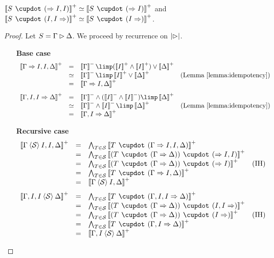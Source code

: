 \begin{lemma}
  $\psint{S \mix (\seq I, I)} \semequiv \psint{S \mix (\seq I)}$ and
  $\psint{S \mix (I, I \seq)} \semequiv \psint{S \mix (I \seq)}$.
\end{lemma}
\begin{proof}
  Let $S = \Gamma \mathbin{\rhd} \Delta$. We proceed by recurrence on $\left|\mathbin{\rhd}\right|$.
  \begin{itemize}
    \item[\textbf{Base case}]
    $$
    \begin{array}{rcll}
      \psint{\Gamma \seq I, I, \Delta}
      &=& \nsint{\Gamma} \limp (\psint{I} \land \psint{I}) \vee \psint{\Delta} & \\
      &\semequiv& \nsint{\Gamma} \limp \psint{I} \vee \psint{\Delta} &\text{(\reflemma{idempotency})} \\
      &=& \psint{\Gamma \seq I, \Delta} & \\
    \end{array}
    $$
    $$
    \begin{array}{rcll}
      \psint{\Gamma, I, I \seq \Delta}
      &=& \nsint{\Gamma} \land (\nsint{I} \land \nsint{I}) \limp \psint{\Delta} & \\
      &\semequiv& \nsint{\Gamma} \land \nsint{I} \limp \psint{\Delta} &\text{(\reflemma{idempotency})} \\
      &=& \psint{\Gamma, I \seq \Delta} & \\
    \end{array}
    $$
    \item[\textbf{Recursive case}]
    $$
    \begin{array}{rcll}
      \psint{\Gamma \piq{\cS} I, I, \Delta}
      &=& \bigwedge_{T \in \cS}{\psint{T \mix (\Gamma \seq I, I, \Delta)}} & \\
      &=& \bigwedge_{T \in \cS}{\psint{(T \mix (\Gamma \seq \Delta)) \mix (\seq I, I)}} & \\
      &=& \bigwedge_{T \in \cS}{\psint{(T \mix (\Gamma \seq \Delta)) \mix (\seq I)}} &\text{(IH)} \\
      &=& \bigwedge_{T \in \cS}{\psint{T \mix (\Gamma \seq I, \Delta)}} & \\
      &=& \psint{\Gamma \piq{\cS} I, \Delta} & \\
    \end{array}
    $$
    $$
    \begin{array}{rcll}
      \psint{\Gamma, I, I \piq{\cS} \Delta}
      &=& \bigwedge_{T \in \cS}{\psint{T \mix (\Gamma, I, I \seq \Delta)}} & \\
      &=& \bigwedge_{T \in \cS}{\psint{(T \mix (\Gamma \seq \Delta)) \mix (I, I \seq)}} & \\
      &=& \bigwedge_{T \in \cS}{\psint{(T \mix (\Gamma \seq \Delta)) \mix (I \seq)}} &\text{(IH)} \\
      &=& \bigwedge_{T \in \cS}{\psint{T \mix (\Gamma, I \seq \Delta)}} & \\
      &=& \psint{\Gamma, I \piq{\cS} \Delta} & \\
    \end{array}
    $$
  \end{itemize}
\end{proof}

